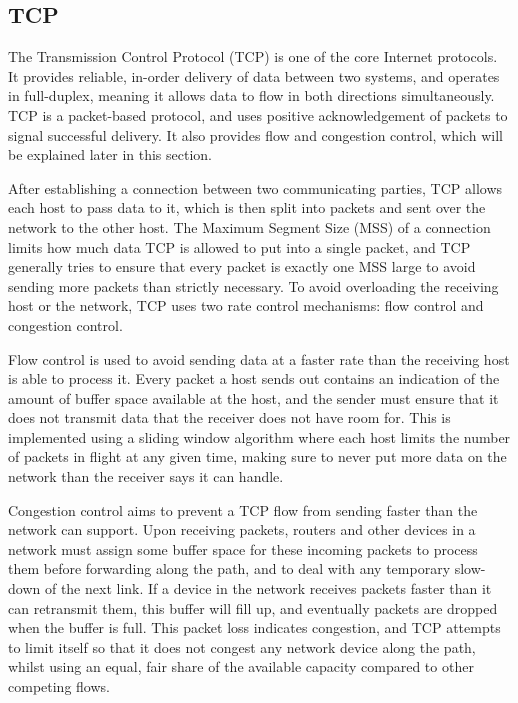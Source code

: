\subsection{TCP}
\label{sec:bg:tcp}
The Transmission Control Protocol (TCP) is one of the core Internet protocols.
It provides reliable, in-order delivery of data between two systems, and
operates in full-duplex, meaning it allows data to flow in both directions
simultaneously. TCP is a packet-based protocol, and uses positive
acknowledgement of packets to signal successful delivery. It also provides flow
and congestion control, which will be explained later in this section.

After establishing a connection between two communicating parties, TCP allows
each host to pass data to it, which is then split into packets and sent over the
network to the other host. The Maximum Segment Size (MSS) of a connection limits
how much data TCP is allowed to put into a single packet, and TCP generally
tries to ensure that every packet is exactly one MSS large to avoid sending more
packets than strictly necessary. To avoid overloading the receiving host or the
network, TCP uses two rate control mechanisms: flow control and congestion
control.

Flow control is used to avoid sending data at a faster rate than the receiving
host is able to process it. Every packet a host sends out contains an indication
of the amount of buffer space available at the host, and the sender must ensure
that it does not transmit data that the receiver does not have room for. This is
implemented using a sliding window algorithm where each host limits the number
of packets in flight at any given time, making sure to never put more data on
the network than the receiver says it can handle.

Congestion control aims to prevent a TCP flow from sending faster than the
network can support. Upon receiving packets, routers and other devices in a
network must assign some buffer space for these incoming packets to process them
before forwarding along the path, and to deal with any temporary slow-down of
the next link. If a device in the network receives packets faster than it can
retransmit them, this buffer will fill up, and eventually packets are dropped
when the buffer is full. This packet loss indicates congestion, and TCP attempts
to limit itself so that it does not congest any network device along the path,
whilst using an equal, fair share of the available capacity compared to other
competing flows.


